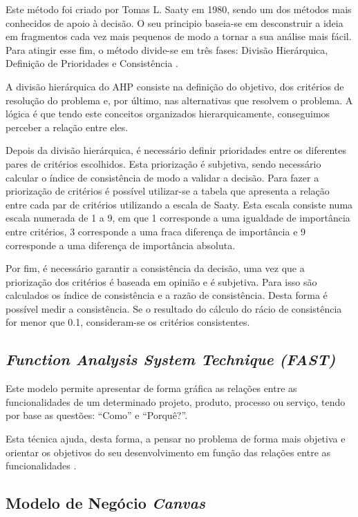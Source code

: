 Este método foi criado por Tomas L. Saaty em 1980, sendo um dos métodos mais conhecidos de apoio à decisão. O seu principio baseia-se em desconstruir a ideia em fragmentos cada vez mais pequenos de modo a tornar a sua análise mais fácil. Para atingir esse fim, o método divide-se em três fases: Divisão Hierárquica, Definição de Prioridades e Consistência \cite{ahp}.

A divisão hierárquica do AHP consiste na definição do objetivo, dos critérios de resolução do problema e, por último, nas alternativas que resolvem o problema. A lógica é que tendo este conceitos organizados hierarquicamente, conseguimos perceber a relação entre eles.

Depois da divisão hierárquica, é necessário definir prioridades entre os diferentes pares de critérios escolhidos. Esta priorização é subjetiva, sendo necessário calcular o índice de consistência de modo a validar a decisão. Para fazer a priorização de critérios é possível utilizar-se a tabela que apresenta a relação entre cada par de critérios utilizando a escala de Saaty. Esta escala consiste numa escala numerada de 1 a 9, em que 1 corresponde a uma igualdade de importância entre critérios, 3 corresponde a uma fraca diferença de importância e 9 corresponde a uma diferença de importância absoluta. 


Por fim, é necessário garantir a consistência da decisão, uma vez que a priorização dos critérios é baseada em opinião e é subjetiva. Para isso são calculados os
índice de consistência e a razão de consistência. Desta forma é possível medir a consistência. Se o resultado do cálculo do rácio de consistência for menor que 0.1, consideram-se os critérios consistentes.

\subsection{\emph{Function Analysis System Technique (FAST) \label{sym:FAST}}}

Este modelo permite apresentar de forma gráfica as relações entre as funcionalidades de um determinado projeto, produto, processo ou serviço, tendo por base as questões: “Como” e “Porquê?”\cite{fast}.

Esta técnica ajuda, desta forma, a pensar no problema de forma mais objetiva e orientar os objetivos do seu desenvolvimento em função das relações entre as funcionalidades \cite{fast}.


\subsection{Modelo de Negócio \emph{Canvas}}

